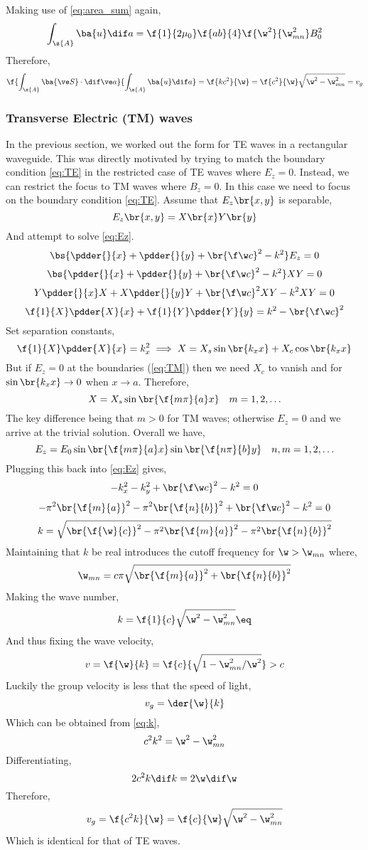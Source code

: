 \documentclass{article}
\begin{document}
Making use of \cref{eq:area_sum} again,
\[ \int_{\s{A}} \ba{u} \dif a = \f{1}{2 \mu_0} \f{ab}{4}\f{\w^2}{\w^2_{mn}} B_0^2\]
Therefore,
\[ \f{\int_{\s{A}} \ba{\ve S} \cdot \dif \ve a}{\int_{\s{A}} \ba{u} \dif a} = \f{k c^2}{\w} = \f{c^2}{\w}\sqrt{\w^2 - \w_{mn}^2} = v_g \]

\subsubsection{Transverse Electric (TM) waves}
In the previous section, we worked out the form for TE waves in a rectangular waveguide. This was directly motivated by trying to match the boundary condition \cref{eq:TE} in the restricted case of TE waves where $E_z = 0$. Instead, we can restrict the focus to TM waves where $B_z = 0$. In this case we need to focus on the boundary condition \cref{eq:TE}. Assume that $E_z\br{x,y}$ is separable,
\[ E_z\br{x,y} = X\br{x}Y\br{y} \]
And attempt to solve \cref{eq:Ez}.
\[ \bs{\pdder{}{x} + \pdder{}{y} + \br{\f \w c}^2 - k^2} E_z = 0 \]
\[ \bs{\pdder{}{x} + \pdder{}{y} + \br{\f \w c}^2 - k^2} XY = 0 \]
\[ Y\pdder{}{x}X + X\pdder{}{y}Y + \br{\f \w c}^2 XY - k^2XY = 0 \]
\[ \f{1}{X}\pdder{X}{x} + \f{1}{Y}\pdder{Y}{y} = k^2 - \br{\f \w c}^2  \]
Set separation constants,
\[ \f{1}{X}\pdder{X}{x} = k_x^2 \implies X = X_s \sin\br{k_x x} + X_c \cos\br{k_x x}  \]
But if $E_z = 0$ at the boundaries (\cref{eq:TM}) then we need $X_c$ to vanish and for $\sin\br{k_x x} \to 0$ when $x \to a$. Therefore,
\[ X = X_s \sin\br{\f{m \pi}{a} x} \quad m = 1,2,\ldots\]
The key difference being that $m > 0$ for TM waves; otherwise $E_z = 0$ and we arrive at the trivial solution. Overall we have,
\[ E_z = E_0\sin\br{\f{m \pi}{a} x}\sin\br{\f{n \pi}{b} y} \quad n,m = 1,2,\ldots\]
Plugging this back into \cref{eq:Ez} gives,
\[ -k_x^2 -k_y^2 + \br{\f \w c}^2 - k^2 = 0 \]
\[ -\pi^2\br{\f{m}{a}}^2 -\pi^2\br{\f{n}{b}}^2 + \br{\f \w c}^2 - k^2 = 0 \]
\[ k = \sqrt{\br{\f{\w}{c}}^2 -\pi^2\br{\f{m}{a}}^2 -\pi^2\br{\f{n}{b}}^2 } \]
Maintaining that $k$ be real introduces the cutoff frequency for $\w > \w_{mn}$ where,
\[ \w_{mn} = c \pi \sqrt{\br{\f{m}{a}}^2 + \br{\f{n}{b}}^2}  \]
Making the wave number,
\[ k = \f{1}{c}\sqrt{\w^2 - \w_{mn}^2} \eq \label{eq:k}\]
And thus fixing the wave velocity,
\[ v = \f{\w}{k}= \f{c}{\sqrt{1 - {\w^2_{mn}}/{\w^2}}} > c \]
Luckily the group velocity is less that the speed of light,
\[ v_g = \der{\w}{k} \]
Which can be obtained from \cref{eq:k},
\[ c^2 k^2 = \w^2 - \w_{mn}^2 \]
Differentiating,
\[ 2 c^2 k \dif k = 2 \w \dif \w \]
Therefore,
\[ v_g = \f{c^2 k}{\w} = \f{c}{\w}\sqrt{\w^2 - \w_{mn}^2} \]
Which is identical for that of TE waves.\\
\end{document}
